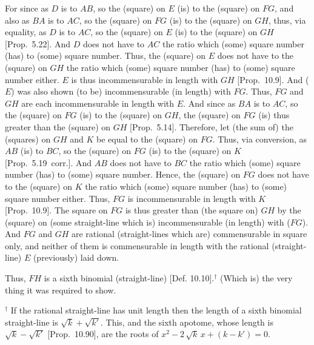\begin{Parallel}{}{}
{For since as $D$ is to $AB$, so the (square) on $E$ (is) to the (square) on
$FG$, and also as $BA$ is to $AC$, so the (square) on $FG$ (is) to
the (square) on $GH$, thus, via equality, as $D$ is to $AC$, so
the (square) on $E$ (is) to the (square) on $GH$ [Prop.~5.22]. And $D$ does not have to $AC$ the
ratio which (some) square number (has) to (some) square number.  Thus, 
the (square) on $E$ does not have to the (square) on $GH$ the ratio
which (some) square number (has) to (some) square number either. $E$
is thus incommensurable in length with $GH$ [Prop.~10.9]. And ($E$) was also shown (to be)
incommensurable (in length) with $FG$.  Thus,  $FG$ and $GH$ are
each incommensurable in length with $E$. And since as $BA$ is to $AC$, 
so the (square) on $FG$ (is) to the (square) on $GH$, the (square) on $FG$ (is) thus greater than the (square) on $GH$ [Prop.~5.14]. Therefore, let (the sum of) the
(squares) on $GH$ and $K$ be equal to the (square) on $FG$. Thus,
via conversion, as $AB$ (is) to $BC$,
 so the (square) on $FG$ (is) to the
(square) on $K$ [Prop.~5.19~corr.].  And $AB$ does not
have to $BC$ the ratio which (some) square number (has) to (some) square number. Hence, the (square) on $FG$ does not have to the (square) on
$K$ the ratio which (some) square number (has) to (some) square number either. Thus, $FG$ is incommensurable in length with $K$ [Prop.~10.9]. The square on $FG$ is thus
greater than (the square on) $GH$ by the (square) on (some straight-line which is) incommensurable (in length) with ($FG$). And  $FG$ and $GH$ are rational
(straight-lines which are) commensurable in square only, and neither of them
is commensurable in length with the  rational (straight-line) $E$ (previously)
laid down.

Thus, $FH$ is a  sixth binomial (straight-line) [Def. 10.10].$^\dag$ (Which is) the very thing it was required to show.}
\end{Parallel}
{\footnotesize\noindent$^\dag$ If the rational straight-line has unit length then the length of a sixth binomial straight-line
is  $\sqrt{k}+\sqrt{k'}$. This, and the sixth apotome,
whose length is $\sqrt{k}-\sqrt{k'}$ [Prop.~10.90],
are the roots of $x^2- 2\,\sqrt{k}\,x+(k-k')=0$.}

